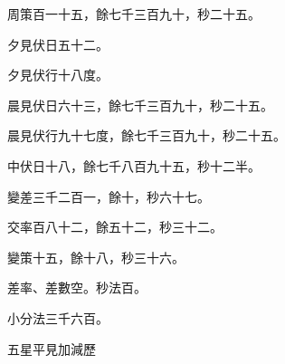 \begin{pinyinscope}
 周策百一十五，餘七千三百九十，秒二十五。



 夕見伏日五十二。



 夕見伏行十八度。



 晨見伏日六十三，餘七千三百九十，秒二十五。



 晨見伏行九十七度，餘七千三百九十，秒二十五。



 中伏日十八，餘七千八百九十五，秒十二半。



 變差三千二百一，餘十，秒六十七。



 交率百八十二，餘五十二，秒三十二。



 變策十五，餘十八，秒三十六。



 差率、差數空。秒法百。



 小分法三千六百。



 五星平見加減歷



\end{pinyinscope}